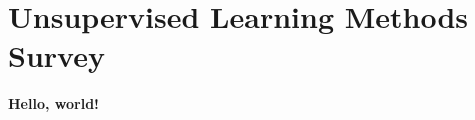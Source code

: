 \documentclass[../main.tex]{subfiles}
\begin{document}
    
\chapter{Unsupervised Learning Methods Survey} \label{unsupervised_learning_methods_survey}
    
\textbf{Hello, world!}
\end{document}
